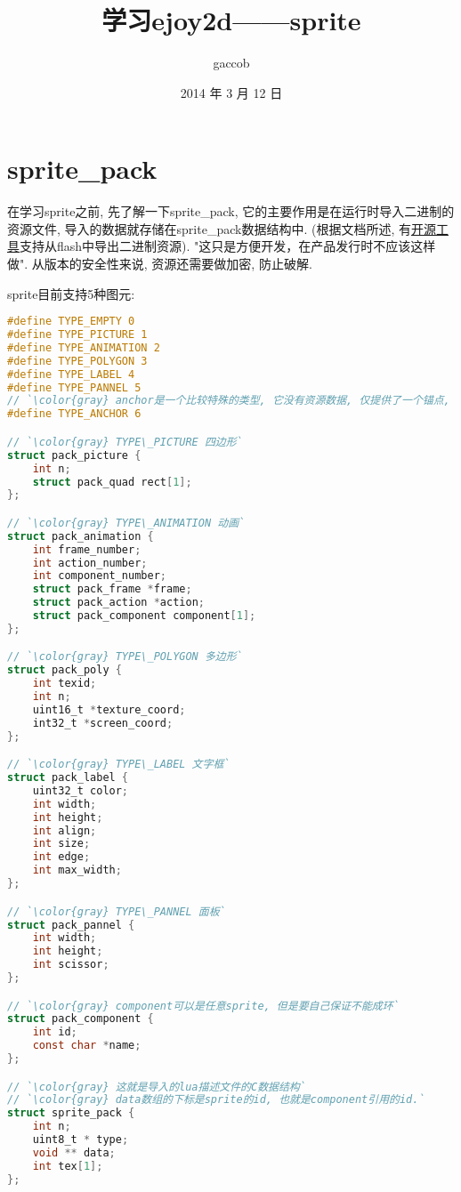 

\title {\ZHH \huge 学习ejoy2d——sprite}
\author {\small gaccob}
\date {\small 2014 年 3 月 12 日}
\maketitle

\section {\ZHH sprite\_pack} {

    {在学习sprite之前, 先了解一下sprite\_pack, 它的主要作用是在运行时导入二进制的资源文件, 导入的数据就存储在sprite\_pack数据结构中. (根据文档所述, 有\href{https://github.com/robinxb/flash-parser}{开源工具}支持从flash中导出二进制资源). "这只是方便开发，在产品发行时不应该这样做". 从版本的安全性来说, 资源还需要做加密, 防止破解. }\par

    {sprite目前支持5种图元:}\par
\begin{lstlisting}[language=C]
#define TYPE_EMPTY 0
#define TYPE_PICTURE 1
#define TYPE_ANIMATION 2
#define TYPE_POLYGON 3
#define TYPE_LABEL 4
#define TYPE_PANNEL 5
// `\color{gray} anchor是一个比较特殊的类型, 它没有资源数据, 仅提供了一个锚点, 可以挂载其他sprite`
#define TYPE_ANCHOR 6

// `\color{gray} TYPE\_PICTURE 四边形`
struct pack_picture {
    int n;
    struct pack_quad rect[1];
};

// `\color{gray} TYPE\_ANIMATION 动画`
struct pack_animation {
    int frame_number;
    int action_number;
    int component_number;
    struct pack_frame *frame;
    struct pack_action *action;
    struct pack_component component[1];
};

// `\color{gray} TYPE\_POLYGON 多边形`
struct pack_poly {
    int texid;
    int n;
    uint16_t *texture_coord;
    int32_t *screen_coord;
};

// `\color{gray} TYPE\_LABEL 文字框`
struct pack_label {
    uint32_t color;
    int width;
    int height;
    int align;
    int size;
    int edge;
    int max_width;
};

// `\color{gray} TYPE\_PANNEL 面板`
struct pack_pannel {
    int width;
    int height;
    int scissor;
};

// `\color{gray} component可以是任意sprite, 但是要自己保证不能成环`
struct pack_component {
    int id;
    const char *name;
};

// `\color{gray} 这就是导入的lua描述文件的C数据结构`
// `\color{gray} data数组的下标是sprite的id, 也就是component引用的id.`
struct sprite_pack {
    int n;
    uint8_t * type;
    void ** data;
    int tex[1];
};
\end{lstlisting}

}
